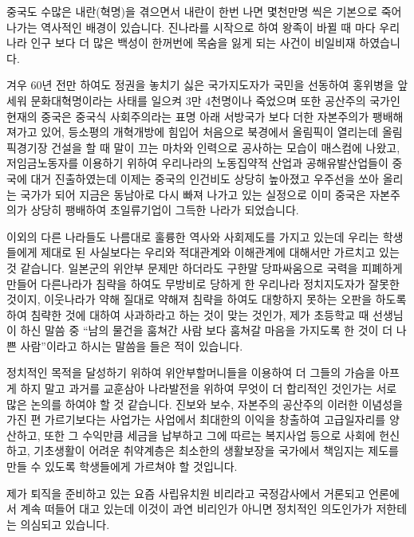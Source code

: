 \documentclass[chapter,book,openany,twoside]{oblivoir}
\begin{document}
중국도 수많은 내란(혁명)을 겪으면서 내란이 한번 나면 몇천만명 씩은 기본으로 죽어나가는 역사적인 배경이 있습니다. 진나라를 시작으로 하여 왕족이 바뀔 때 마다 우리나라 인구 보다 더 많은 백성이 한꺼번에 목숨을 잃게 되는 사건이 비일비재 하였습니다.

겨우 60년 전만 하여도 정권을 놓치기 싫은 국가지도자가 국민을 선동하여 홍위병을 앞세워 문화대혁명이라는 사태를 일으켜 3만 4천명이나 죽었으며 또한 공산주의 국가인 현재의 중국은 중국식 사회주의라는 표명 아래 서방국가 보다 더한 자본주의가 팽배해져가고 있어, 등소평의 개혁개방에 힘입어 처음으로 북경에서 올림픽이 열리는데 올림픽경기장 건설을 할 때 말이 끄는 마차와 인력으로 공사하는 모습이 매스컴에 나왔고, 저임금노동자를 이용하기 위하여 우리나라의 노동집약적 산업과 공해유발산업들이 중국에 대거 진출하였는데 이제는 중국의 인건비도 상당히 높아졌고 우주선을 쏘아 올리는 국가가 되어 지금은 동남아로 다시 빠져 나가고 있는 실정으로 이미 중국은 자본주의가 상당히 팽배하여 초일류기업이 그득한 나라가 되었습니다.

이외의 다른 나라들도 나름대로 훌륭한 역사와 사회제도를 가지고 있는데 우리는 학생들에게 제대로 된 사실보다는 우리와 적대관계와 이해관계에 대해서만 가르치고 있는 것 같습니다. 일본군의 위안부 문제만 하더라도 구한말 당파싸움으로 국력을 피폐하게 만들어 다른나라가 침략을 하여도 무방비로 당하게 한 우리나라 정치지도자가 잘못한 것이지, 이웃나라가 약해 질대로 약해져 침략을 하여도 대항하지 못하는 오판을 하도록 하여 침략한 것에 대하여 사과하라고 하는 것이 맞는 것인가, 제가 초등학교 때 선생님이 하신 말씀 중 ``남의 물건을 훔쳐간 사람 보다 훔쳐갈 마음을 가지도록 한 것이 더 나쁜 사람''이라고 하시는 말씀을 들은 적이 있습니다. 

정치적인 목적을 달성하기 위하여 위안부할머니들을 이용하여 더 그들의 가슴을 아프게 하지 말고 과거를 교훈삼아 나라발전을 위하여 무엇이 더 합리적인 것인가는 서로 많은 논의를 하여야 할 것 같습니다. 진보와 보수, 자본주의 공산주의 이러한 이념성을 가진 편 가르기보다는 사업가는 사업에서 최대한의 이익을 창출하여 고급일자리를 양산하고, 또한 그 수익만큼 세금을 납부하고 그에 따르는 복지사업 등으로 사회에 헌신하고, 기초생활이 어려운 취약계층은 최소한의 생활보장을 국가에서 책임지는 제도를 만들 수 있도록 학생들에게 가르쳐야 할 것입니다.

제가 퇴직을 준비하고 있는 요즘 사립유치원 비리라고 국정감사에서 거론되고 언론에서 계속 떠들어 대고 있는데 이것이 과연 비리인가 아니면 정치적인 의도인가가 저한테는 의심되고 있습니다.
\end{document}
